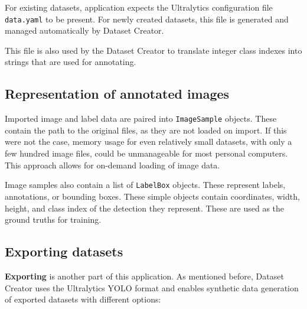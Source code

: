 For existing datasets, application expects the Ultralytics configuration file
\texttt{data.yaml} to be present. For newly created datasets, this file is generated and
managed automatically by Dataset Creator.

This file is also used by the Dataset Creator to translate integer class indexes into strings that are used for annotating.

\subsection{Representation of annotated images}
Imported image and label data are paired into \texttt{ImageSample} objects. These contain the path to the original files, as they are not loaded on import. If this were not the case, memory usage for even relatively small datasets, with only a few hundred image files, could be unmanageable for most personal computers. This approach allows for on-demand loading of image data. 

Image samples also contain a list of \texttt{LabelBox} objects. These represent labels, annotations, or bounding boxes. These simple objects contain coordinates, width, height, and class index of the detection they represent. These are used as the ground truths for training. 


\subsection{Exporting datasets}
\textbf{Exporting} is another part of this application. As mentioned before, Dataset Creator uses the Ultralytics YOLO format and enables synthetic data generation of exported datasets with different options: 

